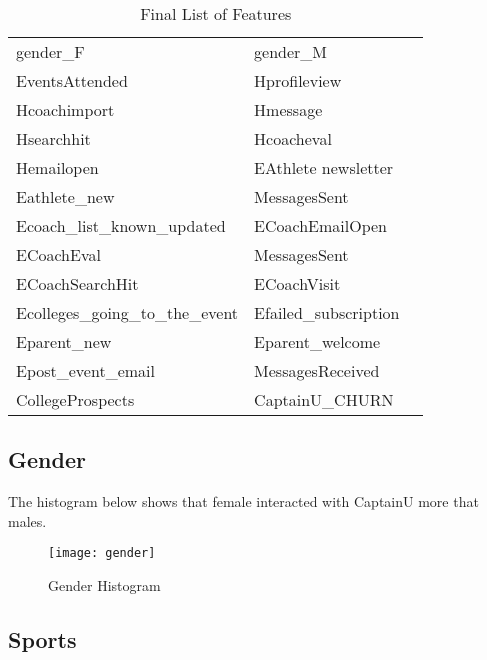 \documentclass[
10pt, %
a4paper, %
oneside, %
headinclude,footinclude, %
BCOR5mm, %
]{scrartcl}
\begin{document}
\begin{table}[H]
\centering
\caption{Final List of Features}
\label{my-label}
\begin{tabular}{lll}
gender\_F                        & gender\_M                    &  \\
EventsAttended                   & Hprofileview                 &  \\
Hcoachimport                     & Hmessage                     &  \\
Hsearchhit                       & Hcoacheval                   &  \\
Hemailopen                       & EAthlete newsletter          &  \\
Eathlete\_new                    & MessagesSent  &  \\
Ecoach\_list\_known\_updated     & ECoachEmailOpen              &  \\
ECoachEval                       & MessagesSent                 &  \\
ECoachSearchHit                  & ECoachVisit                  &  \\
Ecolleges\_going\_to\_the\_event & Efailed\_subscription        &  \\
Eparent\_new                     & Eparent\_welcome             &  \\
Epost\_event\_email              & MessagesReceived                 &  \\
CollegeProspects                 & CaptainU\_CHURN              &  \\
\end{tabular}
\end{table}

\subsection{Gender}

The histogram below shows that female interacted with CaptainU more that males. 

\begin{figure}[H]
\centering 
\texttt{[image: gender]} 
\caption[Lostic Regression Confusion Matrix]{Gender Histogram} %
\label{fig:gallery} 
\end{figure}

\subsection{Sports}
\end{document}
